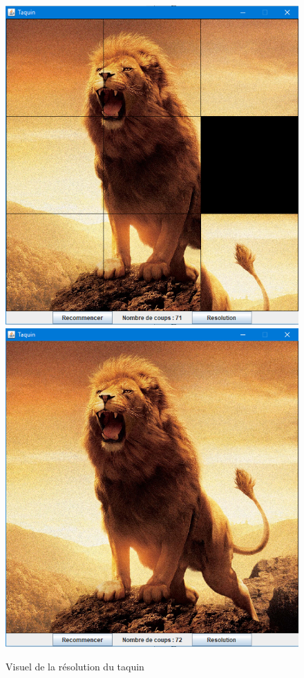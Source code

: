 \documentclass[a4paper,12pt]{article} %
\begin{document}
\begin{figure}[!h]
\centering
\includegraphics[scale=0.4]{images/Capture3.PNG}
\hspace{0.2cm}
\includegraphics[scale=0.4]{images/Capture4.PNG}
\caption{Visuel de la résolution du taquin}
\end{figure}
\end{document}
